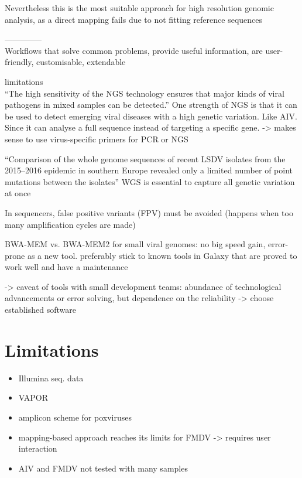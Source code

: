 Nevertheless this is the most suitable approach for high resolution genomic analysis, as a direct mapping fails due to not fitting reference sequences

--------------\\
Workflows that solve common problems, provide useful information, are user-friendly, customisable, extendable

limitations \\

``The high sensitivity of the \ac{NGS} technology ensures that major kinds of viral pathogens in mixed samples can be detected.''
One strength of \ac{NGS} is that it can be used to detect emerging viral diseases with a high genetic variation. Like \ac{AIV}. Since it can analyse a full sequence instead of targeting a specific gene. -> makes sense to use virus-specific primers for \ac{PCR} or \ac{NGS} 

``Comparison of the whole genome sequences of recent \ac{LSDV} isolates from the 2015–2016 epidemic in southern Europe revealed only a limited number of point mutations between the isolates'' \ac{WGS} is essential to capture all genetic variation at once

In sequencers, false positive variants (\ac{FPV}) must be avoided (happens when too many amplification cycles are made)

BWA-MEM vs. BWA-MEM2 for small viral genomes: no big speed gain, error-prone as a new tool. preferably stick to known tools in Galaxy that are proved to work well and have a maintenance

-> caveat of tools with small development teams: abundance of technological advancements or error solving, but dependence on the reliability -> choose established software


\section{Limitations}
\todoit
\begin{itemize}
    \item Illumina seq. data
    \item VAPOR 
    \item amplicon scheme for poxviruses
    \item mapping-based approach reaches its limits for FMDV -> requires user interaction
    \item AIV and FMDV not tested with many samples
\end{itemize}


